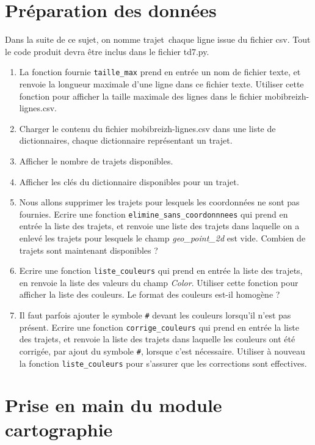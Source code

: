 \documentclass[11pt,a4paper]{article}
\begin{document}
\section{Préparation des données}
Dans la suite de ce sujet, on nomme \og trajet\fg ~chaque ligne issue du fichier csv.
Tout le code produit devra être inclus dans le fichier td7.py.
\begin{enumerate}
\item La fonction fournie \verb+taille_max+ prend en entrée un nom de fichier texte, et renvoie la longueur maximale d'une ligne dans ce fichier texte. Utiliser cette fonction pour afficher la taille maximale des lignes dans le fichier mobibreizh-lignes.csv.

\item Charger le contenu du fichier mobibreizh-lignes.csv dans une liste de dictionnaires, chaque dictionnaire représentant un trajet.
\item Afficher le nombre de trajets disponibles.
\item Afficher les clés du dictionnaire disponibles pour un trajet.
\item Nous allons supprimer les trajets pour lesquels les coordonnées ne sont pas fournies. Ecrire une fonction \verb+elimine_sans_coordonnnees+ qui prend en entrée la liste des trajets, et renvoie une liste des trajets dans laquelle on a enlevé les trajets pour lesquels le champ \emph{geo\_point\_2d} est vide. Combien de trajets sont maintenant disponibles ? 
\item Ecrire une fonction \verb+liste_couleurs+ qui prend en entrée la liste des trajets, en renvoie la liste des valeurs du champ \emph{Color}. Utiliser cette fonction pour afficher la liste des couleurs. Le format des couleurs est-il homogène ? 
\item Il faut parfois ajouter le symbole \verb+#+ devant les couleurs lorsqu'il n'est pas présent. Ecrire une fonction  \verb+corrige_couleurs+ qui prend en entrée la liste des trajets, et renvoie la liste 
des trajets dans laquelle les couleurs ont été corrigée, par ajout du symbole \verb+#+, lorsque c'est nécessaire. Utiliser à nouveau la fonction  \verb+liste_couleurs+ pour s'assurer que les corrections sont effectives.
\end{enumerate}


\section{Prise en main du module cartographie}
\end{document}

